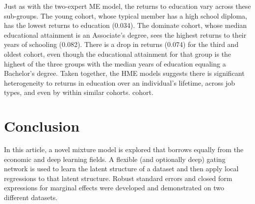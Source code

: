 \documentclass[12pt]{article}
\theoremstyle{definition}
\begin{document}
Just as with the two-expert ME model, the returns to education vary across these 
sub-groups. The young cohort, whose typical member has a high school diploma, has
the lowest returns to education (0.034). The dominate cohort, whose median educational attainment 
is an Associate's degree, sees the highest returns to their years of schooling (0.082).
There is a drop in returns (0.074) for the third and oldest cohort, even though the educational
attainment for that group is the highest of the three groups with the median years of
education equaling a Bachelor's degree. Taken together, the HME models
suggests there is significant heterogeneity to returns in education over an
individual's lifetime, across job types, and even by within similar cohorts.
cohort. 

\section{Conclusion} \label{sec:Conclusion}

In this article, a novel mixture model is explored that borrows equally from the
economic and deep learning fields. A flexible (and optionally deep) gating network
is used to learn the latent structure of a dataset and then apply local
regressions to that latent structure. Robust standard errors and closed form expressions
for marginal effects were developed and demonstrated on two different datasets. 
\end{document}
